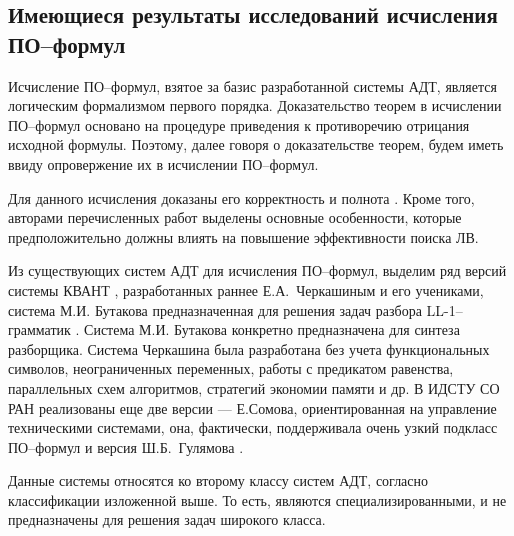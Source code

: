 \subsection{Имеющиеся результаты исследований исчисления ПО--формул}
Исчисление ПО--формул, взятое за базис разработанной системы АДТ, является логическим формализмом первого порядка. Доказательство теорем в исчислении ПО--формул основано на процедуре приведения к противоречию отрицания исходной формулы. Поэтому, далее говоря о доказательстве теорем, будем иметь ввиду опровержение их в исчислении ПО--формул.

Для данного исчисления доказаны его корректность и полнота \cite{ICDS2000, DavydovX}. Кроме того, авторами перечисленных работ выделены основные особенности, которые предположительно должны влиять на повышение эффективности поиска ЛВ.

Из существующих систем АДТ для исчисления ПО--формул, выделим ряд версий системы КВАНТ \cite{dissChe, Che2, QUANT4}, разработанных раннее Е.А.~Черкашиным и его учениками, система М.И. Бутакова предназначенная для решения задач разбора LL-1--грамматик \cite{Butakov1}. Система М.И. Бутакова конкретно предназначена для синтеза разборщика. Система Черкашина была разработана без учета функциональных символов, неограниченных переменных, работы с предикатом равенства, параллельных схем алгоритмов, стратегий экономии памяти и др. В ИДСТУ СО РАН реализованы еще две версии --- Е.Сомова, ориентированная на управление техническими системами, она, фактически, поддерживала очень узкий подкласс ПО--формул и версия Ш.Б.~Гулямова \cite{Gulamov}.

Данные системы относятся ко второму классу систем АДТ, согласно классификации изложенной выше. То есть, являются специализированными, и не предназначены для решения задач широкого класса.



